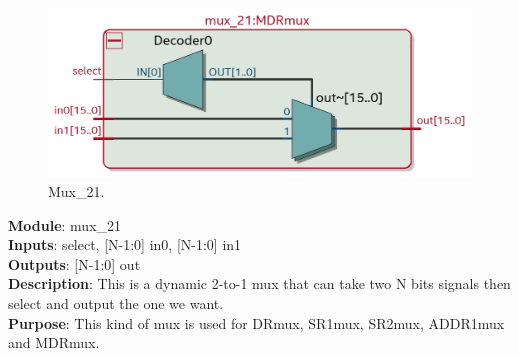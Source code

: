 \documentclass[12pt]{article}
\begin{document}
\begin{figure}[H]
    \centering
    \includegraphics[width=15cm]{mux21.png}
    \caption{Mux\_21.}
\end{figure}
\textbf{Module}: mux\_21 \\ 
\textbf{Inputs}: select, [N-1:0] in0, [N-1:0] in1\\ 
\textbf{Outputs}: [N-1:0] out\\ 
\textbf{Description}: This is a dynamic 2-to-1 mux that can take two N bits signals then select and output the one we want. \\ 
\textbf{Purpose}: This kind of mux is used for DRmux, SR1mux, SR2mux, ADDR1mux and MDRmux. \\
\end{document}

